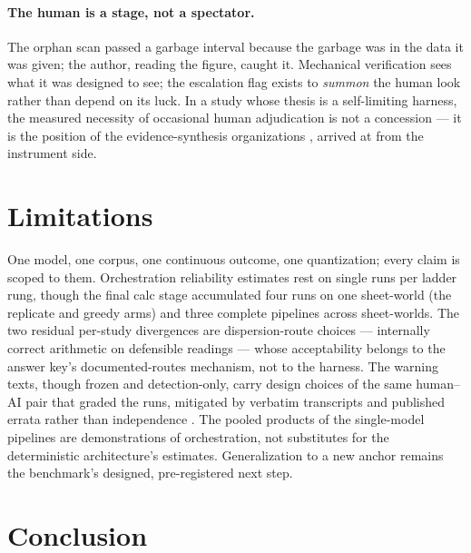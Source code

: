 \documentclass[11pt]{article}
\begin{document}
\paragraph{The human is a stage, not a spectator.} The orphan scan passed a garbage interval because the garbage was in the data it was given; the author, reading the figure, caught it. Mechanical verification sees what it was designed to see; the escalation flag exists to \emph{summon} the human look rather than depend on its luck. In a study whose thesis is a self-limiting harness, the measured necessity of occasional human adjudication is not a concession --- it is the position of the evidence-synthesis organizations \citep{flemyng2025position}, arrived at from the instrument side.

\section{Limitations}

One model, one corpus, one continuous outcome, one quantization; every claim is scoped to them. Orchestration reliability estimates rest on single runs per ladder rung, though the final calc stage accumulated four runs on one sheet-world (the replicate and greedy arms) and three complete pipelines across sheet-worlds. The two residual per-study divergences are dispersion-route choices --- internally correct arithmetic on defensible readings --- whose acceptability belongs to the answer key's documented-routes mechanism, not to the harness. The warning texts, though frozen and detection-only, carry design choices of the same human--AI pair that graded the runs, mitigated by verbatim transcripts and published errata rather than independence \citep{zheng2023judging}. The pooled products of the single-model pipelines are demonstrations of orchestration, not substitutes for the deterministic architecture's estimates. Generalization to a new anchor remains the benchmark's designed, pre-registered next step.

\section{Conclusion}
\end{document}
